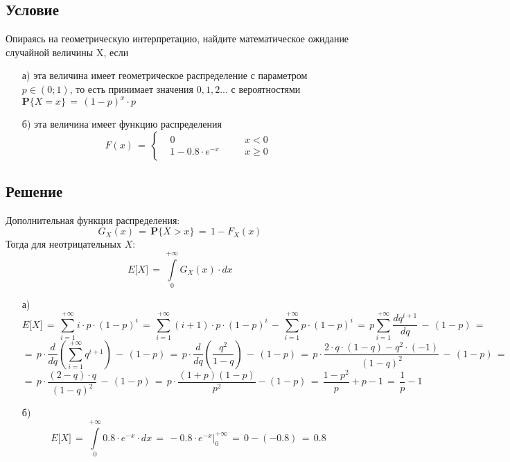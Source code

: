 \documentclass{article}
\begin{document}
\subsection*{Условие}
Опираясь на геометрическую интерпретацию, найдите математическое ожидание случайной величины X, если
\begin{enumerate}
\item[а)] эта величина имеет геометрическое распределение с параметром $ p \! \in \! (0;1) $, то есть принимает значения $ 0,1,2... $ с вероятностями $ \mathbf{P} \big\{ X \! = \! x \big\} \, = \, {(1 \! - \! p)}^x \! \cdot \! p $
\item[б)] эта величина имеет функцию распределения
\begin{equation*}
F(x) \, = \,
\left\{
\begin{aligned}
& 0 & & \quad x \! < \! 0 \\
& 1 \! - \! 0.8 \! \cdot \! e^{-x} & & \quad x \! \geqslant \! 0
\end{aligned}
\right.
\end{equation*}
\end{enumerate}
\subsection*{Решение}
Дополнительная функция распределения:
\[ G_X(x) \, = \, \mathbf{P} \big\{ X \! > \! x \big\} \, = \, 1 \! - \! F_X(x) \]
Тогда для неотрицательных $ X $:
\[ E \big[ X \big] \, = \, \int\limits_0^{+\infty} G_X(x) \! \cdot \! dx \]
\begin{enumerate}
\item[а)]
\[ E \big[ X \big] \, = \, \sum\limits_{i=1}^{+\infty} i \! \cdot \! p \! \cdot \! {(1 \! - \! p)}^i \, = \, \sum\limits_{i=1}^{+\infty} (i \! + \! 1) \! \cdot \! p \! \cdot \! {(1 \! - \! p)}^i \, - \, \sum\limits_{i=1}^{+\infty} p \! \cdot \! {(1 \! - \! p)}^i \, = \, p \sum\limits_{i=1}^{+\infty} \dfrac{dq^{i+1}}{dq} \, - \, (1 \! - \! p) \, = \]
\[ = \, p \! \cdot \! \dfrac{d}{dq} \left( \sum\limits_{i=1}^{+\infty} q^{i+1} \right) \, - \, (1 \! - \! p) \, = \, p \! \cdot \! \dfrac{d}{dq} \left( \dfrac{q^2}{1 \! - \! q} \right) \, - \, (1 \! - \! p) \, = \, p \! \cdot \! \dfrac{2 \! \cdot \! q \! \cdot \! (1 \! - \! q) \! - \! q^2 \! \cdot \! (-1)}{{(1 \! - \! q)}^2} \, - \, (1 \! - \! p) \, = \]
\[ = \, p \! \cdot \! \dfrac{(2 \! - \! q) \! \cdot \! q}{{(1 \! - \! q)}^2} \, - \, (1 \! - \! p) \, = \, p \! \cdot \! \dfrac{(1 \! + \! p) (1 \! - \! p)}{p^2} \! - \! (1 \! - \! p) \, = \, \dfrac{1 \! - \! p^2}{p} \! + \! p \! - \! 1 \, = \, \dfrac{1}{p} \! - \! 1 \]
\item[б)]
\[ E \big[ X \big] \, = \, \int\limits_0^{+\infty} 0.8 \! \cdot \! e^{-x} \! \cdot \! dx \, = \, -0.8 \! \cdot \! e^{-x} \Big|_0^{+\infty} \, = \, 0 \! - \! (-0.8) \, = \, 0.8 \]
\end{enumerate}
\end{document}
